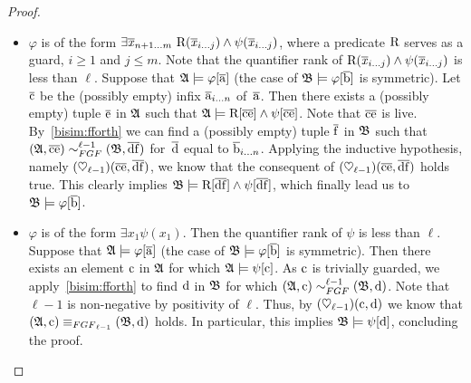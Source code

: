 \begin{proof}
\begin{itemize}
  \item $\varphi$ is of the form $\exists{\vartuplexfromto{n{+}1}{m}}\ \relR(\vartuplexfromto{i}{j}) \land \psi(\vartuplexfromto{i}{j})$, where a predicate $\mathrm{R}$ serves as a guard, $i \geq 1$ and $j \leq m$.
  Note that the quantifier rank of $\mathrm{R}(\overline{\mathit{x}}_{i\ldots j}) \land \psi(\overline{\mathit{x}}_{i\ldots j})$ is less than $\ell$.
  Suppose that ${\mathfrak{A}} \models \varphi[\overline{\mathrm{a}}]$ (the case of ${\mathfrak{B}} \models \varphi[\overline{\mathrm{b}}]$ is symmetric).
  Let $\overline{\mathrm{c}}$ be the (possibly empty) infix $\overline{\mathrm{a}}_{i\ldots n}$ of~$\overline{\mathrm{a}}$.
  Then there exists a (possibly empty) tuple $\overline{\mathrm{e}}$ in ${\mathfrak{A}}$ such that ${\mathfrak{A}} \models \mathrm{R}[\overline{\mathrm{c}}\overline{\mathrm{e}}] \land \psi[\overline{\mathrm{c}}\overline{\mathrm{e}}]$.
  Note that $\overline{\mathrm{c}}\overline{\mathrm{e}}$ is live.
  By~\ref{bisim:fforth} we can find a (possibly empty) tuple $\overline{\mathrm{f}}$ in ${\mathfrak{B}}$ such that $(\str{A}, \elemtuplec\elemtuplee) \bisimto_{\FGF}^{\ell{-}1} (\str{B}, \elemtupled\elemtuplef)$ for~$\overline{\mathrm{d}}$ equal to $\overline{\mathrm{b}}_{i\ldots n}$.
  Applying the inductive hypothesis, namely $(\heartsuit_{\ell{-}1})(\overline{\mathrm{c}}\overline{\mathrm{e}},\overline{\mathrm{d}}\overline{\mathrm{f}})$, we know that the consequent of $(\heartsuit_{\ell{-}1})(\overline{\mathrm{c}}\overline{\mathrm{e}},\overline{\mathrm{d}}\overline{\mathrm{f}})$ holds true.
  This clearly implies ${\mathfrak{B}} \models \mathrm{R}[\overline{\mathrm{d}}\overline{\mathrm{f}}] \land \psi[\overline{\mathrm{d}}\overline{\mathrm{f}}]$, which finally lead us to ${\mathfrak{B}} \models \varphi[\overline{\mathrm{b}}]$.

  \item $\varphi$ is of the form $\exists{x_{1}} \psi(x_1)$. Then the quantifier rank of $\psi$ is less than $\ell$.
  Suppose that ${\mathfrak{A}} \models \varphi[\overline{\mathrm{a}}]$ (the case of ${\mathfrak{B}} \models \varphi[\overline{\mathrm{b}}]$ is symmetric).
  Then there exists an element $\mathrm{c}$ in ${\mathfrak{A}}$ for which ${\mathfrak{A}} \models \psi[\mathrm{c}]$.
  As $\mathrm{c}$ is trivially guarded, we apply~\ref{bisim:fforth} to find $\mathrm{d}$ in ${\mathfrak{B}}$ for which $(\str{A}, \elem{c}) \bisimto_{\FGF}^{\ell{-}1} (\str{B}, \elem{d})$.
  Note that $\ell{-}1$ is non-negative by positivity of $\ell$.
  Thus, by $(\heartsuit_{\ell{-}1})(\mathrm{c},\mathrm{d})$ we know that $(\str{A}, \elem{c}) \equiv_{\FGF_{\ell{-}1}} (\str{B}, \elem{d})$ holds.
  In particular, this implies ${\mathfrak{B}} \models \psi[\mathrm{d}]$, concluding the proof.
\end{itemize}


\end{proof}
